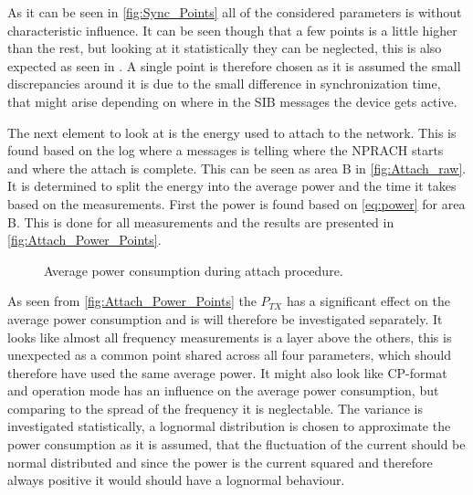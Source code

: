 As it can be seen in \autoref{fig:Sync_Points} all of the considered parameters is without characteristic influence. It can be seen though that a few points is a little higher than the rest, but looking at it statistically they can be neglected, this is also expected as seen in . A single point is therefore chosen as it is assumed the small discrepancies around it is due to the small difference in synchronization time, that might arise depending on where in the \gls{SIB} messages the device gets active. 

The next element to look at is the energy used to attach to the network. This is found based on the log where a messages is telling where the NPRACH starts and where the attach is complete. This can be seen as area B in \autoref{fig:Attach_raw}. It is determined to split the energy into the average power and the time it takes based on the measurements. First the power is found based on \autoref{eq:power} for area B. 
This is done for all measurements and the results are presented in \autoref{fig:Attach_Power_Points}.

\begin{figure}[H]
\centering
\begin{minipage}{0.48\textwidth}
\resizebox{\textwidth}{!}{
}
\end{minipage}
\hfill
\begin{minipage}{0.48\textwidth}
\resizebox{\textwidth}{!}{
}
\end{minipage}
\caption{Average power consumption during attach procedure.}
\label{fig:Attach_Power_Points}
\end{figure}

As seen from \autoref{fig:Attach_Power_Points} the $P_{TX}$ has a significant effect on the average power consumption and is will therefore be investigated separately. It looks like almost all frequency measurements is a layer above the others, this is unexpected as a common point shared across all four parameters, which should therefore have used the same average power. It might also look like CP-format and operation mode has an influence on the average power consumption, but comparing to the spread of the frequency it is neglectable. The variance is investigated statistically, a lognormal distribution is chosen to approximate the power consumption as it is assumed, that the fluctuation of the current should be normal distributed and since the power is the current squared and therefore always positive it would should have a lognormal behaviour.  

